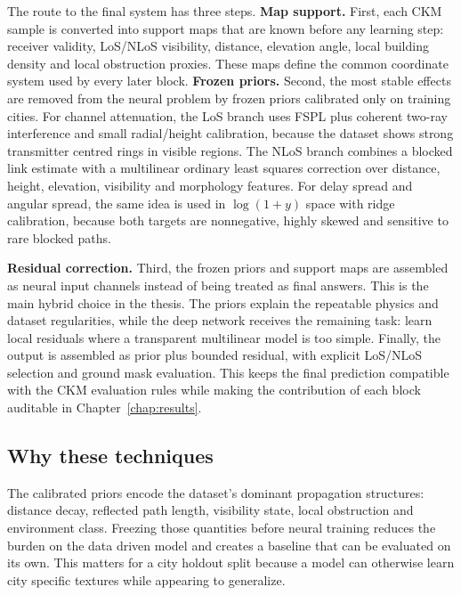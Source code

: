 The route to the final system has three steps. \textbf{Map support.} First,
each CKM sample is converted into support maps that are known before any
learning step: receiver validity, LoS/NLoS visibility, distance, elevation
angle, local building density and local obstruction proxies. These maps define
the common coordinate system used by every later block. \textbf{Frozen priors.}
Second, the most stable effects are removed from the neural problem by frozen
priors calibrated only on training cities. For channel attenuation, the LoS
branch uses FSPL plus coherent two-ray interference and small radial/height
calibration, because the dataset shows strong transmitter centred rings in
visible regions. The NLoS branch combines a blocked link estimate with a
multilinear ordinary least squares correction over distance, height, elevation,
visibility and morphology features. For delay spread and angular spread, the
same idea is used in \(\log(1+y)\) space with ridge calibration, because both
targets are nonnegative, highly skewed and sensitive to rare blocked paths.

\textbf{Residual correction.} Third, the frozen priors and support maps are
assembled as neural input channels instead of being treated as final answers.
This is the main hybrid choice in the thesis. The priors explain the repeatable
physics and dataset regularities, while the deep network receives the remaining
task: learn local residuals where a transparent multilinear model is too
simple. Finally, the output is assembled as prior plus bounded residual, with
explicit LoS/NLoS
selection and ground mask evaluation. This keeps the final prediction
compatible with the CKM evaluation rules while making the contribution of each block
auditable in Chapter~\ref{chap:results}.

\subsection{Why these techniques}
\label{sec:methodology_why_techniques}

The calibrated priors encode the dataset's dominant propagation structures:
distance decay, reflected path length, visibility state, local obstruction and
environment class. Freezing those quantities before neural training reduces the
burden on the data driven model and creates a baseline that can be evaluated on
its own. This matters for a city holdout split because a model can otherwise
learn city specific textures while appearing to generalize.

